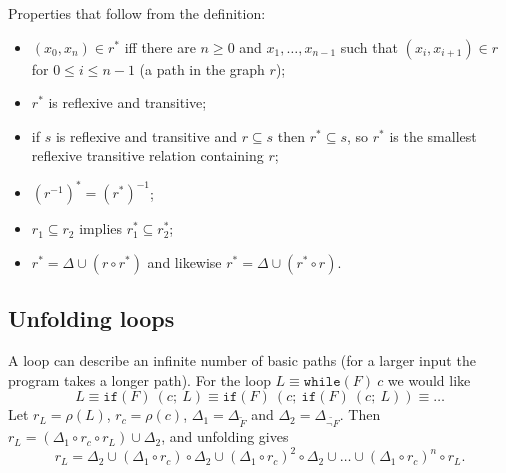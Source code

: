 
Properties that follow from the definition:
\begin{itemize}
  \item $(x_0, x_n) \in r^*$ iff there are $n \ge 0$ and $x_1, \ldots, x_{n-1}$ such that $(x_i, x_{i+1}) \in r$ for $0 \le i \le n-1$ (a path in the graph $r$);
  \item $r^*$ is reflexive and transitive;
  \item if $s$ is reflexive and transitive and $r \subseteq s$ then $r^* \subseteq s$, so $r^*$ is the smallest reflexive transitive relation containing $r$;
  \item $(r^{-1})^* = (r^*)^{-1}$;
  \item $r_1 \subseteq r_2$ implies $r_1^* \subseteq r_2^*$;
  \item $r^* = \Delta \cup (r \circ r^*)$ and likewise $r^* = \Delta \cup (r^* \circ r)$.
\end{itemize}
 
\subsection*{Unfolding loops}
 
A loop can describe an infinite number of basic paths (for a larger input the program takes a longer path). For the loop $L \equiv \texttt{while}(F)\ c$ we would like
\[
L \equiv \texttt{if}(F)\ (c;\ L) \equiv \texttt{if}(F)\ (c;\ \texttt{if}(F)\ (c;\ L)) \equiv \ldots
\]
Let $r_L = \rho(L)$, $r_c = \rho(c)$, $\Delta_1 = \Delta_{\tilde F}$ and $\Delta_2 = \Delta_{\widetilde{\neg F}}$. Then $r_L = (\Delta_1 \circ r_c \circ r_L) \cup \Delta_2$, and unfolding gives
\[
r_L = \Delta_2 \cup (\Delta_1 \circ r_c) \circ \Delta_2 \cup (\Delta_1 \circ r_c)^2 \circ \Delta_2 \cup \ldots \cup (\Delta_1 \circ r_c)^{n} \circ r_L.
\]
 
 
 
